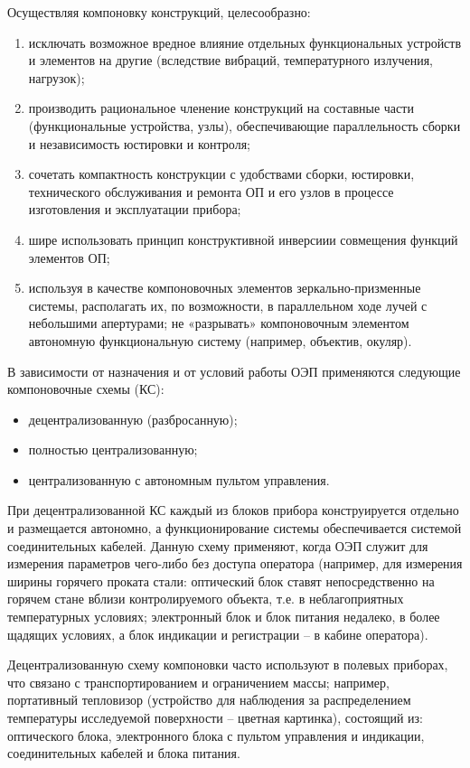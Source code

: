 Осуществляя компоновку конструкций, целесообразно:
\begin{enumerate}
	\item исключать возможное вредное влияние отдельных функциональных устройств и элементов на другие (вследствие вибраций, температурного излучения, нагрузок);
	\item производить рациональное членение конструкций на составные части (функциональные устройства, узлы), обеспечивающие параллельность сборки и независимость юстировки и контроля;
	\item сочетать компактность конструкции с удобствами сборки, юстировки, технического обслуживания и ремонта ОП и его узлов в процессе изготовления и эксплуатации прибора;
	\item шире использовать принцип конструктивной инверсиии совмещения функций элементов ОП;
	\item используя в качестве компоновочных элементов зеркально-призменные системы, располагать их, по возможности, в параллельном ходе лучей с небольшими апертурами; не «разрывать» компоновочным элементом автономную функциональную систему (например, объектив, окуляр).
\end{enumerate}

В зависимости от назначения и от условий работы ОЭП применяются следующие компоновочные схемы (КС):
\begin{itemize}
	\item децентрализованную (разбросанную);
	\item полностью централизованную;
	\item централизованную с автономным пультом управления.
\end{itemize}

При децентрализованной КС каждый из блоков прибора конструируется отдельно и размещается автономно, а функционирование системы обеспечивается системой соединительных кабелей. Данную схему применяют, когда ОЭП служит для измерения параметров чего-либо без доступа оператора (например, для измерения ширины горячего проката стали: оптический блок ставят непосредственно на горячем стане вблизи контролируемого объекта, т.е. в неблагоприятных температурных условиях; электронный блок и блок питания недалеко, в более щадящих условиях, а блок индикации и регистрации -- в кабине оператора).

Децентрализованную схему компоновки часто используют в полевых приборах, что связано с транспортированием и ограничением массы; например, портативный тепловизор (устройство для наблюдения за распределением температуры исследуемой поверхности -- цветная картинка), состоящий из: оптического блока, электронного блока с пультом управления и индикации, соединительных кабелей и блока питания.

